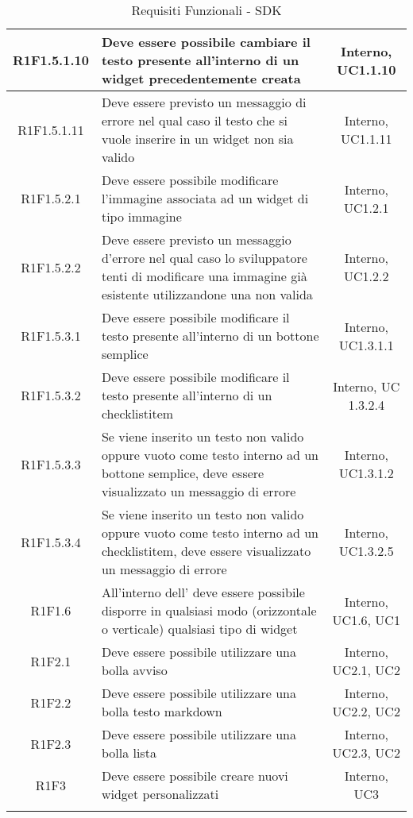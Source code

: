 \begin{longtable}{|c|>{\centering}m{7cm}|c|}
		\hline
		R1F1.5.1.10 & Deve essere possibile cambiare il testo presente all'interno di un widget precedentemente creata & Interno, UC1.1.10 \\
		\hline
		R1F1.5.1.11 & Deve essere previsto un messaggio di errore nel qual caso il testo che si vuole inserire in un widget non sia valido & Interno, UC1.1.11 \\
		\hline
		R1F1.5.2.1 & Deve essere possibile modificare l'immagine associata ad un widget di tipo immagine & Interno, UC1.2.1 \\
		\hline
		R1F1.5.2.2 & Deve essere previsto un messaggio d'errore nel qual caso lo sviluppatore tenti di modificare una immagine già esistente utilizzandone una non valida & Interno, UC1.2.2 \\
		\hline
		R1F1.5.3.1 & Deve essere possibile modificare il testo presente all'interno di un bottone semplice & Interno, UC1.3.1.1 \\
		\hline
		R1F1.5.3.2 & Deve essere possibile modificare il testo presente all'interno di un checklistitem & Interno, UC 1.3.2.4 \\
		\hline
		R1F1.5.3.3 & Se viene inserito un testo non valido oppure vuoto come testo interno ad un bottone semplice, deve essere visualizzato un messaggio di errore & Interno, UC1.3.1.2\\
		\hline
		R1F1.5.3.4 & Se viene inserito un testo non valido oppure vuoto come testo interno ad un checklistitem, deve essere visualizzato un messaggio di errore & Interno, UC1.3.2.5\\
		\hline
		R1F1.6 & All'interno dell'\termine{SDK} deve essere possibile disporre in qualsiasi modo (orizzontale o verticale) qualsiasi tipo di widget & Interno, UC1.6, UC1 \\ 
		\hline
					
			\hline
			R1F2.1 & Deve essere possibile utilizzare una bolla avviso & Interno, UC2.1, UC2 \\
			\hline
			R1F2.2 & Deve essere possibile utilizzare una bolla testo markdown & Interno, UC2.2, UC2 \\
			\hline
			R1F2.3 & Deve essere possibile utilizzare una bolla lista & Interno, UC2.3, UC2 \\
			\hline
			R1F3 & Deve essere possibile creare nuovi widget personalizzati & Interno, UC3 \\
			\hline
\caption[Requisiti Funzionali - SDK]{Requisiti Funzionali - SDK}
\label{tabella: Requisiti Funzionali - SDK}
\end{longtable}
\endgroup
\clearpage